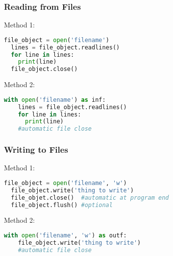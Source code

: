 \documentclass{beamer}
\begin{document}
%
%
\begin{frame}[fragile]
  \frametitle{Reading from Files}
  Method 1:
  \begin{lstlisting}[language=Python, autogobble]
  file_object = open('filename')
  lines = file_object.readlines()
  for line in lines:
    print(line)
  file_object.close()
  \end{lstlisting}
  \vfill
  Method 2:
  \begin{lstlisting}[language=Python, autogobble]
  with open('filename') as inf:
    lines = file_object.readlines()
    for line in lines:
      print(line)
    #automatic file close
  \end{lstlisting}
\end{frame}

%
%
\begin{frame}[fragile]
  \frametitle{Writing to Files}
  Method 1:
  \begin{lstlisting}[language=Python, autogobble]
  file_object = open('filename', 'w')
  file_object.write('thing to write')
  file_objet.close()  #automatic at program end
  file_object.flush() #optional
  \end{lstlisting}
  \vfill
  Method 2:
  \begin{lstlisting}[language=Python, autogobble]
  with open('filename', 'w') as outf:
    file_object.write('thing to write')
    #automatic file close
  \end{lstlisting}
\end{frame}
\end{document}

